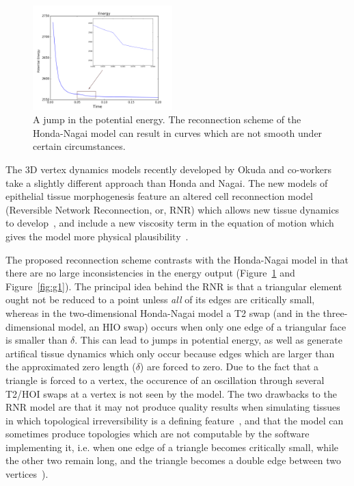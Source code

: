 \begin{figure}
  \begin{center}
    \includegraphics[width=0.48\textwidth]{../diagrams/jump.png}
  \end{center}
\caption[A non-smooth energy curve.]{A jump in the potential energy. The reconnection scheme of the Honda-Nagai model can 
result in curves which are not smooth under certain circumstances.}
\label{fig:jump}
\end{figure}

The 3D vertex dynamics models recently developed by Okuda and co-workers take a slightly different approach than Honda and Nagai. The new models of epithelial tissue morphogenesis feature an altered cell reconnection model (Reversible Network Reconnection, or, RNR) which allows new tissue dynamics to develop~\cite{Okuda1}, and include a new viscosity term in the equation of motion which gives the model more physical plausibility~\cite{Okuda3}.

The proposed reconnection scheme contrasts with the Honda-Nagai model in that there are no large inconsistencies in the energy output (Figure~\ref{fig:jump} and Figure~\ref{fig:g1}). The principal idea behind the RNR is that a triangular element ought not be reduced to a point unless \emph{all} of its edges are critically small, whereas in the two-dimensional Honda-Nagai model a T2 swap (and in the three-dimensional model, an HIO swap) occurs when only one edge of a triangular face is smaller than $\delta$. This can lead to jumps in potential energy, as well as generate artifical tissue dynamics which only occur because edges which are larger than the approximated zero length ($\delta$) are forced to zero. Due to the fact that a triangle is forced to a vertex, the occurence of an oscillation through several T2/HOI swaps at a vertex is not seen by the model. The two drawbacks to the RNR model are that it may not produce quality results when simulating tissues in which topological irreversibility is a defining feature~\cite{CellSurf}, and that the model can sometimes produce topologies which are not computable by the software implementing it, i.e. when one edge of a triangle becomes critically small, while the other two remain long, and the triangle becomes a double edge between two vertices~\cite{Okuda3}).

